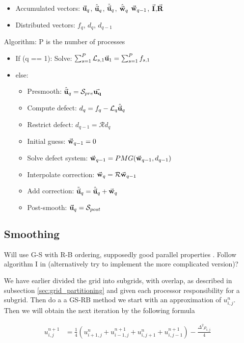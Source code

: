 			\begin{itemize}
				\item Accumulated vectors:	\(\va{u}_q\), \( \hat{\va{u}}_q \), \(\tilde{\va{u}}_q\), \(\hat{\va{w}}_q\) \(\va{w}_{q-1}\), \(\va{I}\),\(\va{R}\)
				\item Distributed vectors:  \( f_q \), \(d_q\), \(d_{q-1}\)
			\end{itemize}
			Algorithm: P is the number of processes
			\begin{itemize}
				\item If (q == 1): Solve: \(\sum_{s=1}^P\mathcal{L}_{s,1} \va{u}_1 = \sum_{s=1}^Pf_{s,1}\)
				\item else:
					\begin{itemize}
						\item Presmooth: \( \hat{\va{u}}_q = \mathcal{S}_{pre} \va{u_q}\)
						\item Compute defect: \( d_q = f_q - \mathcal{L}_q \hat{\va{u}}_q \)
						\item Restrict defect: \( d_{q -1} = \mathcal{R} d_q \)
						\item Initial guess:   \( \va{w}_{q-1} = 0 \)
						\item Solve defect system: \( \va{w}_{q-1} = PMG(\va{w}_{q-1}, d_{q -1} ) \)
						\item Interpolate correction: \( \va{w}_q = \mathcal{R} \va{w}_{q-1} \)
						\item Add correction:		\( \tilde{\va{u}}_q = \hat{\va{u}}_q + \va{w}_q \)
						\item Post-smooth:			\( \va{u}_q = \mathcal{S}_{post}\)
					\end{itemize}
			\end{itemize}


		\subsection{Smoothing}
			Will use G-S with R-B ordering, supposedly good parallel properties \citep{Chow2006}. Follow algorithm I in \cite{Adams2001} (alternatively try to implement the more complicated version)?

			We have earlier divided the grid into subgrids, with overlap, as described in subsection \ref{sec:grid_partitioning} and given each processor responsibility for a subgrid. Then do a a GS-RB method we start with an approximation of \(u^{n}_{i,j}\). Then we will obtain the next iteration by the following formula

			\begin{align}
				u^{n+1}_{i,j} &= \frac{1}{4}\left( u^n_{i+1,j} + u^{n +1}_{i-1,j} + u^{n}_{i, j+1} + u^{n+1}_{i,j-1}  \right) - \frac{\Delta^2 \rho_{i,j}}{4}
			\end{align}

